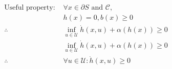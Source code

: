 \documentclass[preview]{standalone}
\begin{document}
\begin{align*}
\text{Useful property: } &\forall x \in \partial S \text{ and } \mathcal{C},\\ &h(x) = 0, b(x) \geq 0\\ \therefore &\inf_{u \in \mathcal{U}} \dot h(x, u) + \alpha(h(x)) \geq 0\\ & \inf_{u \in \mathcal{U}} \dot h(x, u) + \alpha(h(x)) \geq 0\\ \therefore & \forall u \in \mathcal{U}: \dot h(x, u) \geq 0
\end{align*}
\end{document}
